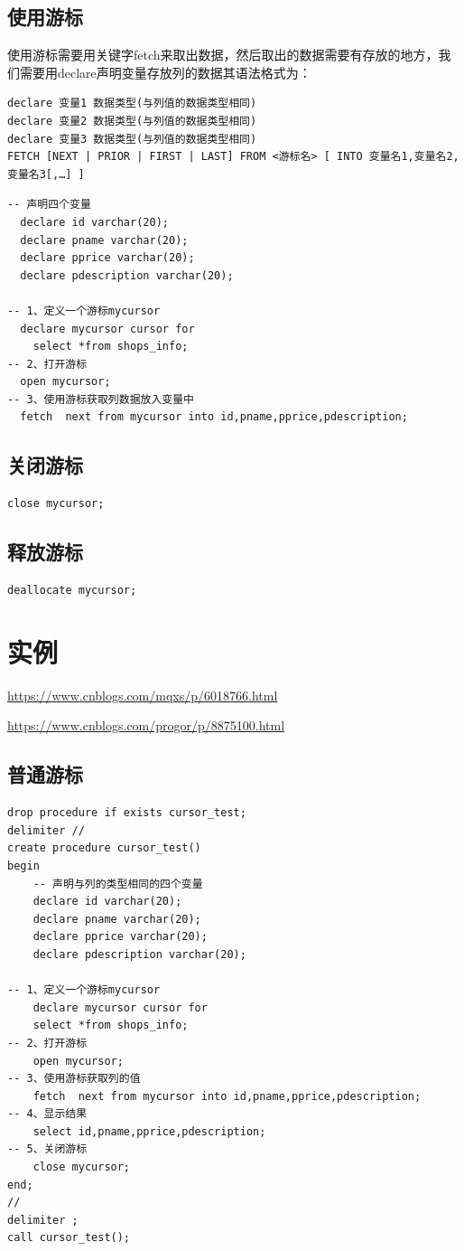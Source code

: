 \documentclass[UTF8,a4paper,12pt]{ctexbook}
\begin{document}
		\subsection{使用游标}
			使用游标需要用关键字fetch来取出数据，然后取出的数据需要有存放的地方，我们需要用declare声明变量存放列的数据其语法格式为：
			\begin{lstlisting}
declare 变量1 数据类型(与列值的数据类型相同)
declare 变量2 数据类型(与列值的数据类型相同)
declare 变量3 数据类型(与列值的数据类型相同)
FETCH [NEXT | PRIOR | FIRST | LAST] FROM <游标名> [ INTO 变量名1,变量名2,变量名3[,…] ]			
			\end{lstlisting}
			
			\begin{lstlisting}
-- 声明四个变量
  declare id varchar(20); 
  declare pname varchar(20); 
  declare pprice varchar(20);
  declare pdescription varchar(20);
 
-- 1、定义一个游标mycursor
  declare mycursor cursor for
	select *from shops_info;
-- 2、打开游标
  open mycursor;
-- 3、使用游标获取列数据放入变量中
  fetch  next from mycursor into id,pname,pprice,pdescription; 			
			\end{lstlisting}
			
		\subsection{关闭游标}
			\begin{lstlisting}
close mycursor;			
			\end{lstlisting}
		
		
		\subsection{释放游标}
			\begin{lstlisting}
deallocate mycursor;			
			\end{lstlisting}
		
		
	\section{实例}
		\url{https://www.cnblogs.com/mqxs/p/6018766.html}
		
		\url{https://www.cnblogs.com/progor/p/8875100.html}
		
		\subsection{普通游标}
			\begin{lstlisting}
drop procedure if exists cursor_test;
delimiter //
create procedure cursor_test()
begin
    -- 声明与列的类型相同的四个变量
    declare id varchar(20); 
    declare pname varchar(20); 
    declare pprice varchar(20);
    declare pdescription varchar(20);
 
-- 1、定义一个游标mycursor
    declare mycursor cursor for
   	select *from shops_info;
-- 2、打开游标
    open mycursor;
-- 3、使用游标获取列的值
    fetch  next from mycursor into id,pname,pprice,pdescription; 
-- 4、显示结果
    select id,pname,pprice,pdescription;
-- 5、关闭游标
    close mycursor;
end;
//
delimiter ;
call cursor_test();		
			\end{lstlisting}
		
\end{document}
